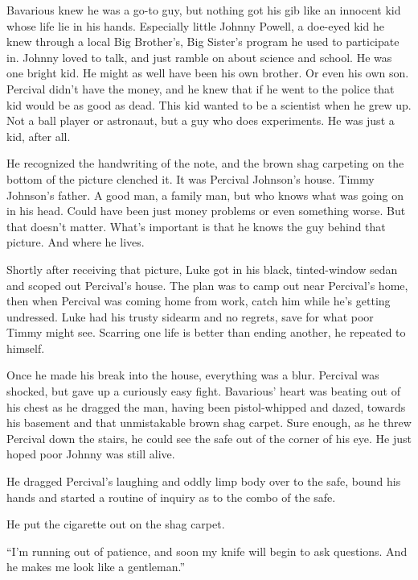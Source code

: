 Bavarious knew he was a go-to guy, but nothing got his gib like an
innocent kid whose life lie in his hands. Especially little Johnny
Powell, a doe-eyed kid he knew through a local Big Brother's,
Big Sister's program he used to participate in. Johnny loved
to talk, and just ramble on about science and school. He was one
bright kid. He might as well have been his own brother. Or even his
own son. Percival didn't have the money, and he knew that if
he went to the police that kid would be as good as dead. This kid
wanted to be a scientist when he grew up. Not a ball player or
astronaut, but a guy who does experiments. He was just a kid, after
all.



He recognized the handwriting of the note, and the brown shag
carpeting on the bottom of the picture clenched it. It was Percival
Johnson's house. Timmy Johnson's father. A good man, a
family man, but who knows what was going on in his head. Could have
been just money problems or even something worse. But that
doesn't matter. What's important is that he knows the
guy behind that picture. And where he lives.



Shortly after receiving that picture, Luke got in his black,
tinted-window sedan and scoped out Percival's house. The plan
was to camp out near Percival's home, then when Percival was
coming home from work, catch him while he's getting
undressed. Luke had his trusty sidearm and no regrets, save for
what poor Timmy might see. Scarring one life is better than ending
another, he repeated to himself.



Once he made his break into the house, everything was a blur.
Percival was shocked, but gave up a curiously easy fight.
Bavarious' heart was beating out of his chest as he dragged
the man, having been pistol-whipped and dazed, towards his basement
and that unmistakable brown shag carpet. Sure enough, as he threw
Percival down the stairs, he could see the safe out of the corner
of his eye. He just hoped poor Johnny was still alive.



He dragged Percival's laughing and oddly limp body over to
the safe, bound his hands and started a routine of inquiry as to
the combo of the safe.



He put the cigarette out on the shag carpet.



``I'm running out of patience, and soon my knife will
begin to ask questions. And he makes me look like a
gentleman.''

